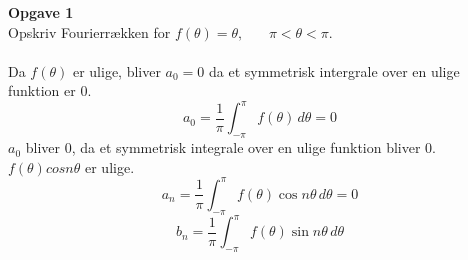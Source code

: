 \documentclass[12pt,a4paper,draft]{report}
\author{Frederik Appel Vardinghus-Nielsen}
\begin{document}
\noindent \textbf{Opgave 1}\\
Opskriv Fourierrækken for $f(\theta)=\theta, \phantom{mm} \pi < \theta < \pi$.\\\\
Da $f(\theta)$ er ulige, bliver $a_0=0$ da et symmetrisk intergrale over en ulige funktion er 0.
\begin{equation}
a_0=\frac{1}{\pi}\int_{-\pi}^{\pi} \! f(\theta) \, d\theta=0
\end{equation}
$a_0$ bliver 0, da et symmetrisk integrale over en ulige funktion bliver 0. $f(\theta)cos n\theta$ er ulige.
\begin{equation}
a_n=\frac{1}{\pi}\int_{-\pi}^{\pi}\! f(\theta)\cos n\theta \, d\theta = 0
\end{equation}
\begin{equation}
b_n=\frac{1}{\pi}\int_{-\pi}^{\pi} \! f(\theta)\sin n\theta \, d\theta
\end{equation}
\end{document}
